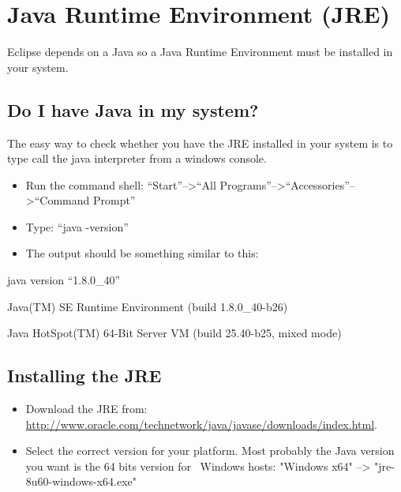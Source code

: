 \hypertarget{h.2et92p0}{\section{\texorpdfstring{{Java Runtime
Environment (JRE)}}{Java Runtime Environment (JRE)}}\label{h.2et92p0}}

{Eclipse depends on a Java so a Java Runtime Environment must be
installed in your system.}

\subsection{\texorpdfstring{{Do I have Java in my
system?}}{Do I have Java in my system?}}\label{do-i-have-java-in-my-system}

{The easy way to check whether you have the JRE installed in your system
is to type call the java interpreter from a windows console.}

\begin{itemize}
\tightlist
\item
  {Run the command shell: ``Start''--\textgreater{}``All
  Programs''--\textgreater{}``Accessories''--\textgreater{}``Command
  Prompt''}
\item
  {Type: ``java -version''}
\item
  {The output should be something similar to this:}
\end{itemize}

{java version ``1.8.0\_40''}

{Java(TM) SE Runtime Environment (build 1.8.0\_40-b26)}

{Java HotSpot(TM) 64-Bit Server VM (build 25.40-b25, mixed mode)}

\subsection{\texorpdfstring{{Installing the
JRE}}{Installing the JRE}}\label{installing-the-jre}

\begin{itemize}
\tightlist
\item
  {Download the JRE from:
  }{\href{https://www.google.com/url?q=http://www.oracle.com/technetwork/java/javase/downloads/index.html\&sa=D\&ust=1511275046373000\&usg=AFQjCNFFJIGcAOFgmFHQHLk6g_3Ml19LyA}{http://www.oracle.com/technetwork/java/javase/downloads/index.html}}{.}
\item
  {Select the correct version for your platform. Most probably the Java
  version you want is the 64 bits version for ~Windows hosts: "}{Windows
  x64}{" --\textgreater{} "}{jre-8u60-windows-x64.exe}{"}
\end{itemize}

